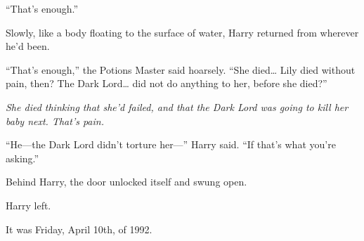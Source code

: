 ``That's enough.''

Slowly, like a body floating to the surface of water, Harry returned
from wherever he'd been.

``That's enough,'' the Potions Master said hoarsely. ``She died\ldots{}
Lily died without pain, then? The Dark Lord\ldots{} did not do anything
to her, before she died?''

\emph{She died thinking that she'd failed, and that the Dark Lord was
going to kill her baby next. That's pain.}

``He---the Dark Lord didn't torture her---'' Harry said. ``If that's
what you're asking.''

Behind Harry, the door unlocked itself and swung open.

Harry left.

It was Friday, April 10th, of 1992.
